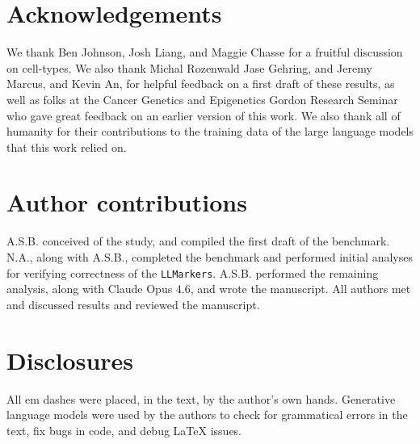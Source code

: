 \documentclass[10pt,twocolumn]{article}
\theoremstyle{plain}
\theoremstyle{definition}
\theoremstyle{remark}
\begin{document}
\section{Acknowledgements}
We thank Ben Johnson, Josh Liang, and Maggie Chasse for a fruitful discussion on cell-types. We also thank Michal Rozenwald Jase Gehring, and Jeremy Marcus, and Kevin An, for helpful feedback on a first draft of these results, as well as folks at the Cancer Genetics and Epigenetics Gordon Research Seminar who gave great feedback on an earlier version of this work. We also thank all of humanity for their contributions to the training data of the large language models that this work relied on. 

\section{Author contributions}
A.S.B. conceived of the study, and compiled the first draft of the benchmark. N.A., along with A.S.B., completed the benchmark and performed initial analyses for verifying correctness of the \texttt{LLMarkers}. A.S.B. performed the remaining analysis, along with Claude Opus 4.6, and wrote the manuscript. All authors met and discussed results and reviewed the manuscript.

\section{Disclosures}
All em dashes were placed, in the text, by the author's own hands. Generative language models were used by the authors to check for grammatical errors in the text, fix bugs in code, and debug \LaTeX{} issues.

\newpage
\printclaimsources
\newpage


\end{document}
